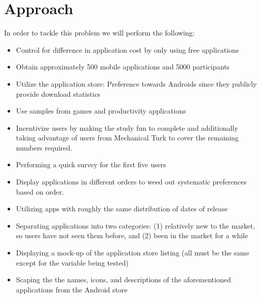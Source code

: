 \section{Approach}

In order to tackle this problem we will perform the following:

\begin{itemize}
\item Control for difference in application cost by only using free applications
\item Obtain approximately 500 mobile applications and 5000 participants 
\item Utilize the application store: Preference towards Androids since they publicly provide download statistics
\item Use samples from games and productivity applications
\item Incentivize users by making the study fun to complete and additionally taking advantage of users from Mechanical Turk to cover the remaining numbers required.
\item Performing a quick survey for the first five users
\item Display applications in different orders to weed out systematic preferences based on order.
\item Utilizing apps with roughly the same distribution of dates of release
\item Separating applications into two categories: (1) relatively new to the market, so users have not seen them before, and (2) been in the market for a while
\item Displaying a mock-up of the application store listing (all must be the same except for the variable being tested)
\item Scaping the the names, icons, and descriptions of the aforementioned applications from the Android store
\end{itemize}










